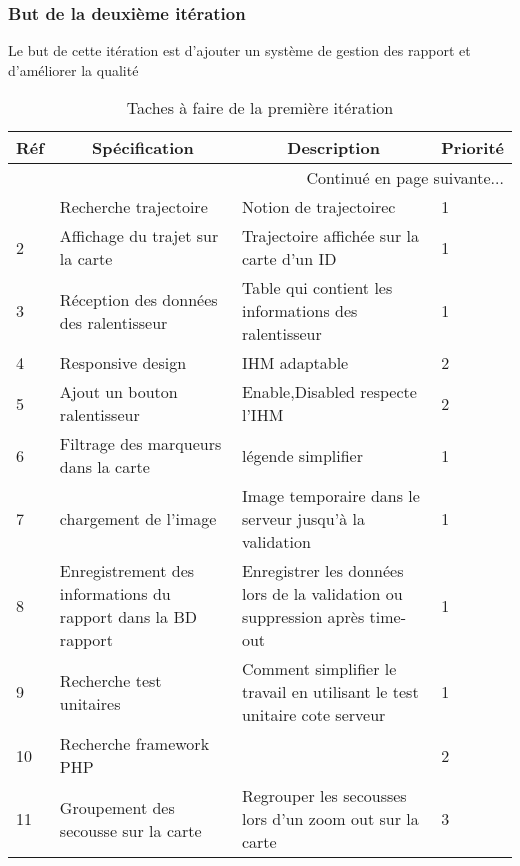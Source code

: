   \subsubsection{But de la deuxième itération}
  Le but de cette itération est d'ajouter un système de gestion des rapport et d'améliorer
  la qualité
  \begin{center}
    \footnotesize
    \begin{longtable}{| p{1cm} | p{5cm} | p{7cm} | p{1cm} |}
        \caption{Taches à faire de la première itération}
        \label{tab:sprint2-backlog} \\

 \hline
 \multicolumn{1}{|c}{\textbf{Réf}} &
 \multicolumn{1}{|c}{\textbf{Spécification}} &
 \multicolumn{1}{|c}{\textbf{Description}} &
 \multicolumn{1}{|c|}{\textbf{Priorité}} \\ \hline
 \endhead

 \hline \multicolumn{4}{|r|}{{Continué en page suivante$\dotsc$}} \\ \hline
 \endfoot

 \hline \hline
 \endlastfoot

\hline
1 & Recherche trajectoire & Notion de trajectoirec & 1 \\ \hline
2 & Affichage du trajet sur la carte&Trajectoire affichée sur la carte d'un ID  & 1 \\ \hline
3 &Réception des données des ralentisseur &Table qui contient les informations des ralentisseur & 1 \\ \hline
4&Responsive design& IHM adaptable & 2 \\ \hline
5 & Ajout un bouton ralentisseur &Enable,Disabled respecte l'IHM  & 2 \\ \hline
6 & Filtrage des marqueurs dans la carte & légende simplifier & 1 \\ \hline
7 & chargement de l'image & Image temporaire dans le serveur jusqu'à la validation & 1 \\ \hline
8 & Enregistrement des informations du rapport dans la BD rapport& Enregistrer les données lors de la validation ou suppression après time-out & 1 \\ \hline
9 & Recherche test unitaires & Comment simplifier le travail en utilisant le test unitaire cote serveur  & 1 \\ \hline
10 & Recherche framework PHP & & 2 \\ \hline 
11 &Groupement des secousse sur la carte & Regrouper les secousses lors d'un zoom out sur la carte & 3 \\ \hline
\end{longtable}
\end{center}

